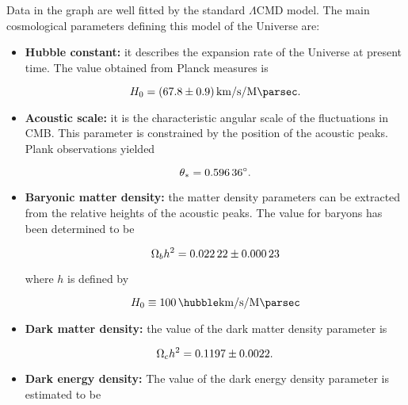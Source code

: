 Data in the graph are well fitted by the standard
$\Lambda$CMD model. The main cosmological parameters defining this model of
the Universe are:

\begin{itemize}
        \item \textbf{Hubble constant:} it describes the expansion rate of
        the Universe at present time. The value obtained from Planck
        measures is

        \begin{equation}
                H_0 = \SI{67.8 \pm 0.9}{\kilo\meter\per\second\per\mega\parsec}.
        \end{equation}

        \item \textbf{Acoustic scale:} it is the characteristic angular
        scale of the fluctuations in CMB. This parameter is constrained by
        the position of the acoustic peaks. Plank observations yielded

        \begin{equation}
                \theta_* = \ang{0.59636 \pm 0.00025}.
        \end{equation}

        \item \textbf{Baryonic matter density:} the matter density
        parameters can be extracted from the relative heights of the
        acoustic peaks. The value for baryons has been determined to be

        \begin{equation}
                \Omega_b h^2 = \num{0.02222 \pm 0.00023}
        \end{equation}

        where $h$ is defined by

        \begin{equation}
                H_0 \equiv \SI{100}{\hubble\kilo\meter\per\second\per\mega\parsec}
        \end{equation}

        \item \textbf{Dark matter density:} the value of the dark matter
        density parameter is

        \begin{equation}
                \Omega_c h^2 = \num{0.1197 \pm 0.0022}.
        \end{equation}

        \item \textbf{Dark energy density:} The value of the dark energy
        density parameter is estimated to be


\end{itemize}
